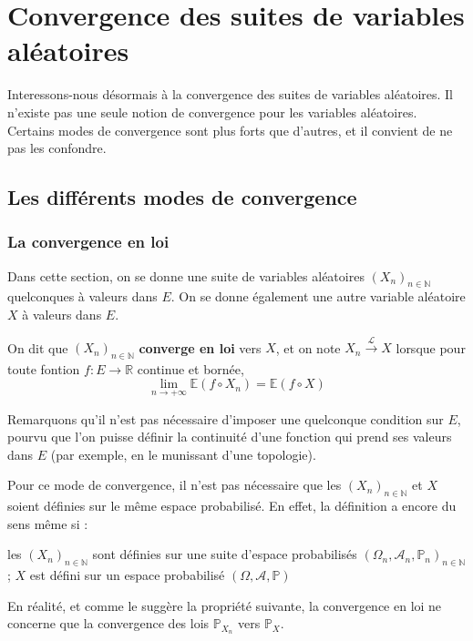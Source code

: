 \documentclass[../integ-proba.tex]{subfiles}
\begin{document}
    \chapter{Convergence des suites de variables aléatoires}

    Interessons-nous désormais à la convergence des suites de variables aléatoires.
    Il n'existe pas une seule notion de convergence pour les variables aléatoires.
    Certains modes de convergence sont plus forts que d'autres, et il convient de ne pas les confondre.

    \section{Les différents modes de convergence}

    \subsection{La convergence en loi}

    Dans cette section, on se donne une suite de variables aléatoires $\left(X_n\right)_{n\in\mathbb{N}}$ quelconques à valeurs dans $E$.
    On se donne également une autre variable aléatoire $X$ à valeurs dans $E$.

    \begin{defi}
        On dit que $\left(X_n\right)_{n\in\mathbb{N}}$ \textbf{converge en loi} vers $X$, et on note $X_n \xrightarrow[]{\mathcal{L}} X$ lorsque pour toute fontion $f:E \rightarrow \mathbb{R}$ continue et bornée,
        \begin{displaymath}
            \lim_{n \to +\infty} \mathbb{E}\left(f \circ X_n\right) = \mathbb{E}\left(f \circ X\right)
        \end{displaymath}
    \end{defi}

    \begin{rem}
        Remarquons qu'il n'est pas nécessaire d'imposer une quelconque condition sur $E$, pourvu que l'on puisse définir la continuité d'une fonction qui prend ses valeurs dans $E$ (par exemple, en le munissant d'une topologie).
    \end{rem}

    \begin{rem}
        Pour ce mode de convergence, il n'est pas nécessaire que les $\left(X_n\right)_{n\in\mathbb{N}}$ et $X$ soient définies sur le même espace probabilisé.
        En effet, la définition a encore du sens même si :
        \begin{itemize}
        \itemb les $\left(X_n\right)_{n\in\mathbb{N}}$ sont définies sur une suite d'espace probabilisés $\left(\Omega_n, \mathcal{A}_n, \mathbb{P}_n\right)_{n \in \mathbb{N}}$ ;
        \itemb $X$ est défini sur un espace probabilisé $\left(\Omega, \mathcal{A}, \mathbb{P}\right)$
        \end{itemize}

        En réalité, et comme le suggère la propriété suivante, la convergence en loi ne concerne que la convergence des lois $\mathbb{P}_{X_n}$ vers $\mathbb{P}_X$.
    \end{rem}
\end{document}
